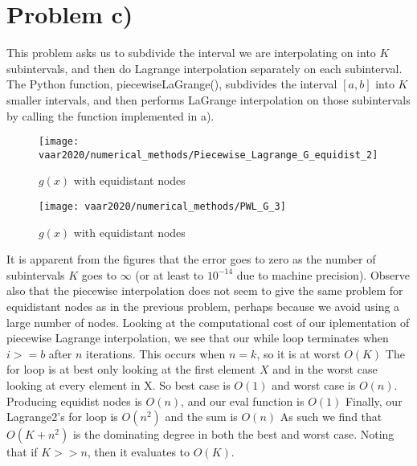 \section{Problem c)}
This problem asks us to subdivide the interval we are interpolating on into $K$ subintervals, and then do Lagrange interpolation separately on each subinterval.
\newline The Python function, piecewiseLaGrange(), subdivides the interval $[a,b]$ into $K$ smaller intervals, and then performs LaGrange interpolation on those subintervals by calling the function implemented in a).
\begin{figure}[H]
    \centering
    \begin{minipage}{0.45\textwidth}
        \centering
        \texttt{[image: vaar2020/numerical\_methods/Piecewise\_Lagrange\_G\_equidist\_2]} %
        \caption{$g(x)$ with equidistant nodes}
    \end{minipage}\hfill
    \begin{minipage}{0.45\textwidth}
        \centering
        \texttt{[image: vaar2020/numerical\_methods/PWL\_G\_3]} %
        \caption{$g(x)$ with equidistant nodes}
    \end{minipage}
\end{figure}
It is apparent from the figures that the error goes to zero as the number of subintervals $K$ goes to $\infty$ (or at least to $10^{-14}$ due to machine precision). Observe also that the piecewise interpolation does not seem to give the same problem for equidistant nodes as in the previous problem, perhaps because we avoid using a large number of nodes.
\newline Looking at the computational cost of our iplementation of piecewise Lagrange interpolation, we see that our while loop terminates when $i >=b$ after $n$ iterations.
This occurs when $n = k$, so it is at worst $O(K)$
The for loop is at best only looking at the first element $X$
and in the worst case looking at every element in X.
So best case is $O(1)$ and worst case is $O(n)$.
Producing equidist nodes is $O(n)$, and our eval function is $O(1)$
Finally, our Lagrange2's for loop is $O(n^2)$ and the sum is $O(n)$
As such we find that $O(K + n^2)$ is the dominating degree in both the best and worst case.
Noting that if $K >> n$, then it evaluates to $O(K)$.

